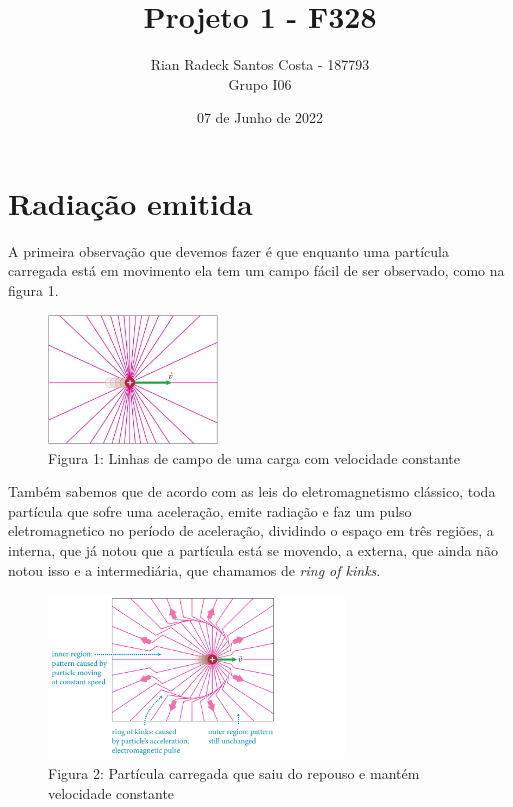 \documentclass[12pt, letterpaper]{article}
\title{Projeto 1 - F328}
\author{Rian Radeck Santos Costa - 187793 \\ Grupo I06}
\date{07 de Junho de 2022}
\begin{document}
\maketitle 

\newpage

\section{Radiação emitida}
    \par
    A primeira observação que devemos fazer é que enquanto uma partícula carregada está em movimento ela tem um campo fácil de ser observado, como na figura 1.
    
    \begin{figure}[h]
        \centering
        \includegraphics[width=0.4\textwidth]{moving particle}
        \\{Figura 1: Linhas de campo de uma carga com velocidade constante}
        \label{fig:fig1}
    \end{figure}

    Também sabemos que de acordo com as leis do eletromagnetismo clássico, toda partícula que sofre uma aceleração, emite radiação e faz um pulso eletromagnetico no período de aceleração, dividindo o espaço em três regiões, a interna, que já notou que a partícula está se movendo, a externa, que ainda não notou isso e a intermediária, que chamamos de \textit{ring of kinks}.

    \begin{figure}[h]
        \centering
        \includegraphics[width=0.7\textwidth]{pulse}
        \\{Figura 2: Partícula carregada que saiu do repouso e mantém velocidade constante}
        \label{fig:fig2}
    \end{figure}
\end{document}
